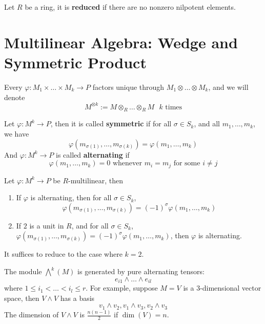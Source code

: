 \documentclass[openany]{book}
\begin{document}
\begin{defn}
    Let $R$ be a ring, it is \textbf{reduced} if there are no nonzero nilpotent elements.
\end{defn}


\section{Multilinear Algebra: Wedge and Symmetric Product}
Every $\varphi:M_1\times\dots\times M_k\to P$ factors unique through $M_1\otimes\dots\otimes M_k$, and we will denote 
\begin{equation*}
    M^{\otimes k}:=M\otimes_R\dots\otimes_R M \text{ $k$ times}
\end{equation*}


\begin{defn}
    Let $\varphi: M^k\to P$, then it is called \textbf{symmetric} if for all $\sigma\in S_k$, and all $m_1,\dots, m_k$, we have 
    \begin{equation*}
        \varphi(m_{\sigma(1)},\dots, m_{\sigma(k)})=\varphi(m_1,\dots, m_k)
    \end{equation*}
    And $\varphi: M^k\to P$ is called \textbf{alternating} if 
    \begin{equation*}
        \varphi(m_1,\dots, m_k)=0 \text{ whenever } m_i=m_j \text{ for some $i\neq j$}
    \end{equation*}
\end{defn}

\begin{prop}
    Let $\varphi:M^k\to P$ be $R$-multilinear, then 
    \begin{enumerate}
        \item If $\varphi$ is alternating, then for all $\sigma\in S_k$, 
        \begin{equation*}
            \varphi(m_{\sigma(1)},\dots, m_{\sigma(k)})=(-1)^\sigma\varphi(m_1,\dots,m_k)
        \end{equation*}
        \item If $2$ is a unit in $R$, and for all $\sigma\in S_k$, $ \varphi(m_{\sigma(1)},\dots, m_{\sigma(k)})=(-1)^\sigma\varphi(m_1,\dots,m_k)$, then $\varphi$ is alternating.
    \end{enumerate}
\end{prop}
It suffices to reduce to the case where $k=2$.


\begin{defn}
    The module $\bigwedge^k(M)$ is generated by pure alternating tensors:
    \begin{equation*}
        e_{i1}\wedge\dots\wedge e_{il}
    \end{equation*}
    where $1\leq i_1<\dots<i_l\leq r$. For example, suppose $M=V$ is a $3$-dimensional vector space, then $V\wedge V$ has a basis 
    \begin{equation*}
        v_1\wedge v_2, v_1\wedge v_3, v_2\wedge v_3
    \end{equation*}
    The dimension of $V\wedge V$ is $\frac{n(n-1)}{2}$ if $\dim(V)=n$.
\end{defn}
\end{document}
